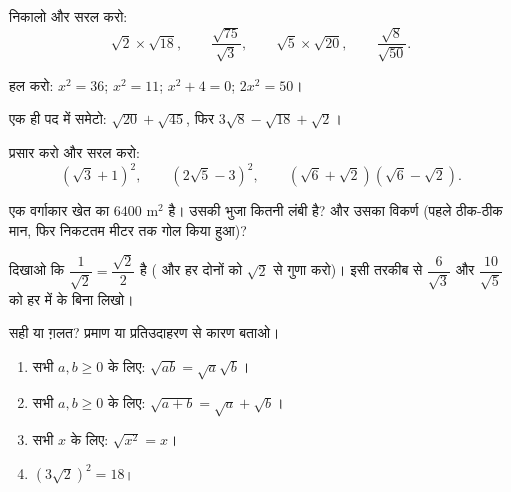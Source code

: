 \begin{exercise}[$\star$]\label{exo:g9:sqrt:3}
निकालो और सरल करो:
\[
\sqrt2 \times \sqrt{18}, \qquad
\frac{\sqrt{75}}{\sqrt3}, \qquad
\sqrt5 \times \sqrt{20}, \qquad
\frac{\sqrt{8}}{\sqrt{50}} .
\]
\end{exercise}

\begin{exercise}[$\star$]\label{exo:g9:sqrt:4}
हल करो: $x^2 = 36$; \quad $x^2 = 11$; \quad $x^2 + 4 = 0$; \quad
$2x^2 = 50$।
\end{exercise}

\begin{exercise}[$\star$]\label{exo:g9:sqrt:5}
एक ही पद में समेटो: $\sqrt{20} + \sqrt{45}$, फिर
$3\sqrt8 - \sqrt{18} + \sqrt2$।
\end{exercise}

\begin{exercise}[$\star\star$]\label{exo:g9:sqrt:6}
प्रसार करो और सरल करो:
\[
\left(\sqrt3 + 1\right)^2, \qquad
\left(2\sqrt5 - 3\right)^2, \qquad
\left(\sqrt6 + \sqrt2\right)\left(\sqrt6 - \sqrt2\right).
\]
\end{exercise}

\begin{exercise}[$\star\star$]\label{exo:g9:sqrt:7}
एक वर्गाकार खेत का  $6400$ m$^2$ है। उसकी भुजा कितनी लंबी
है? और उसका विकर्ण (पहले ठीक-ठीक मान, फिर निकटतम मीटर तक गोल किया
हुआ)?
\end{exercise}

\begin{exercise}[$\star\star$]\label{exo:g9:sqrt:8}
दिखाओ कि $\dfrac{1}{\sqrt2} = \dfrac{\sqrt2}{2}$ है ( और हर दोनों
को $\sqrt2$ से गुणा करो)। इसी तरकीब से $\dfrac{6}{\sqrt3}$ और
$\dfrac{10}{\sqrt5}$ को हर में  के बिना लिखो।
\end{exercise}

\begin{exercise}[$\star\star$]\label{exo:g9:sqrt:9}
सही या ग़लत? प्रमाण या प्रतिउदाहरण से कारण बताओ।
\begin{enumerate}
  \item सभी $a, b \geq 0$ के लिए: $\sqrt{ab} = \sqrt a \sqrt b$।
  \item सभी $a, b \geq 0$ के लिए: $\sqrt{a+b} = \sqrt a + \sqrt b$।
  \item सभी $x$ के लिए: $\sqrt{x^2} = x$।
  \item $\left(3\sqrt2\right)^2 = 18$।
\end{enumerate}
\end{exercise}

